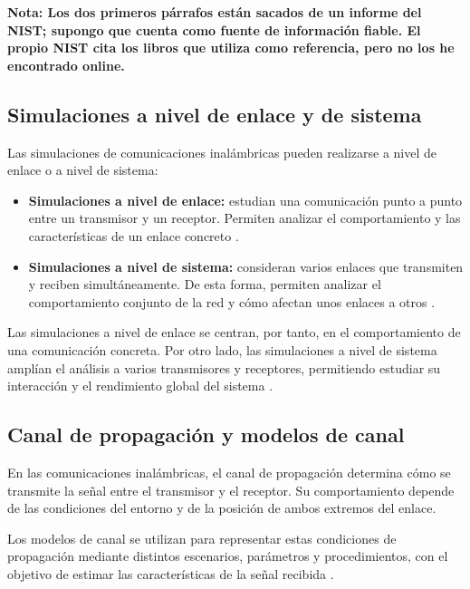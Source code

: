 \par\medskip
\textbf{Nota: Los dos primeros párrafos están sacados de un informe del NIST; supongo que cuenta como fuente de información fiable. El propio NIST cita los libros que utiliza como referencia, pero no los he encontrado online.}
\par\medskip


\subsection{Simulaciones a nivel de enlace y de sistema}

Las simulaciones de comunicaciones inalámbricas pueden realizarse a nivel de enlace o a nivel de sistema:

\begin{itemize}
    \item \textbf{Simulaciones a nivel de enlace:} estudian una comunicación punto a punto entre un transmisor y un receptor. Permiten analizar el comportamiento y las características de un enlace concreto \cite{nvidia_aodt}.

    \item \textbf{Simulaciones a nivel de sistema:} consideran varios enlaces que transmiten y reciben simultáneamente. De esta forma, permiten analizar el comportamiento conjunto de la red y cómo afectan unos enlaces a otros \cite{nvidia_aodt}.
\end{itemize}

Las simulaciones a nivel de enlace se centran, por tanto, en el comportamiento de una comunicación concreta. Por otro lado, las simulaciones a nivel de sistema amplían el análisis a varios transmisores y receptores, permitiendo estudiar su interacción y el rendimiento global del sistema \cite{nvidia_aodt}.


\subsection{Canal de propagación y modelos de canal}

En las comunicaciones inalámbricas, el canal de propagación determina cómo se transmite la señal entre el transmisor y el receptor. Su comportamiento depende de las condiciones del entorno y de la posición de ambos extremos del enlace.

Los modelos de canal se utilizan para representar estas condiciones de propagación mediante distintos escenarios, parámetros y procedimientos, con el objetivo de estimar las características de la señal recibida \cite{etsi138901}.

